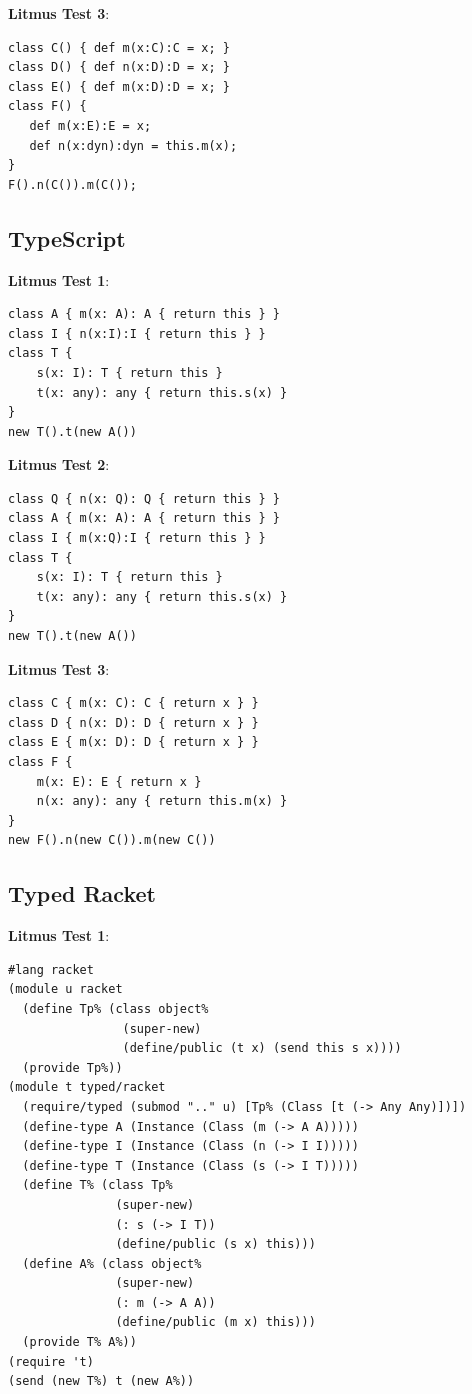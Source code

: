 \documentclass[acmsmall, anonymous, authordraft, review]{acmart} %
\begin{document}
\noindent\textbf{Litmus Test 3}:
\begin{verbatim}
class C() { def m(x:C):C = x; }
class D() { def n(x:D):D = x; }
class E() { def m(x:D):D = x; }      
class F() {
   def m(x:E):E = x;
   def n(x:dyn):dyn = this.m(x);
} 
F().n(C()).m(C());
\end{verbatim}

\subsection*{TypeScript}
\noindent\textbf{Litmus Test 1}:
\begin{verbatim}
class A { m(x: A): A { return this } }
class I { n(x:I):I { return this } }
class T {
    s(x: I): T { return this }
    t(x: any): any { return this.s(x) }
}
new T().t(new A())
\end{verbatim}

\noindent\textbf{Litmus Test 2}:
\begin{verbatim}
class Q { n(x: Q): Q { return this } }
class A { m(x: A): A { return this } }
class I { m(x:Q):I { return this } }
class T {
    s(x: I): T { return this }
    t(x: any): any { return this.s(x) }
}
new T().t(new A())
\end{verbatim}

\noindent\textbf{Litmus Test 3}:
\begin{verbatim}
class C { m(x: C): C { return x } }
class D { n(x: D): D { return x } }
class E { m(x: D): D { return x } }
class F {
    m(x: E): E { return x }
    n(x: any): any { return this.m(x) }
}
new F().n(new C()).m(new C())
\end{verbatim}

\subsection*{Typed Racket}

\noindent\textbf{Litmus Test 1}:

\begin{verbatim}
#lang racket
(module u racket
  (define Tp% (class object%
                (super-new)
                (define/public (t x) (send this s x))))
  (provide Tp%))
(module t typed/racket
  (require/typed (submod ".." u) [Tp% (Class [t (-> Any Any)])])
  (define-type A (Instance (Class (m (-> A A)))))
  (define-type I (Instance (Class (n (-> I I)))))
  (define-type T (Instance (Class (s (-> I T)))))
  (define T% (class Tp%
               (super-new)
               (: s (-> I T))
               (define/public (s x) this)))
  (define A% (class object%
               (super-new)
               (: m (-> A A))
               (define/public (m x) this)))
  (provide T% A%))
(require 't)
(send (new T%) t (new A%))
\end{verbatim}
\end{document}
